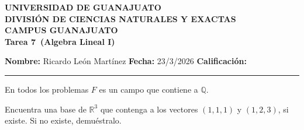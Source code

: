\documentclass[12pt,a4paper]{article}
\newcommand{\alumno}{Ricardo León Martínez}
\newcommand{\materia}{Algebra Lineal I}
\newcommand{\tarea}{Tarea 7}
\newcommand{\fecha}{23/3/2026}
\begin{document}
    \begin{center}
        {\large\textbf{UNIVERSIDAD DE GUANAJUATO}}\\[0.3cm]
        {\normalsize\textbf{DIVISIÓN DE CIENCIAS NATURALES Y EXACTAS}}\\
        {\normalsize\textbf{CAMPUS GUANAJUATO}}\\[1cm]

        {\Large\textbf{\tarea\ (\materia)}}\\[1cm]
    \end{center}

    \noindent
    \textbf{Nombre:} \alumno 
    \hfill 
    \textbf{Fecha:} \fecha 
    \hfill 
    \textbf{Calificación:} \rule{3cm}{0.4pt}

    \vspace{0.3cm}

    En todos los problemas $F$ es un campo que contiene a $\mathbb{Q}$.

    \begin{mdframed}[style=mdbluebox,frametitle={Ejercicio 1}]
        Encuentra una base de $\mathbb{R}^{3}$ que contenga a los vectores $(1,1,1)$ y
        $(1,2,3)$, si existe. Si no existe, demuéstralo.
    \end{mdframed}
\end{document}

